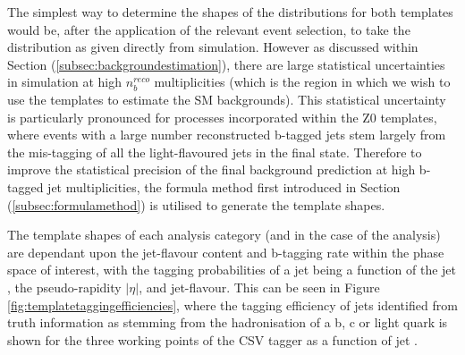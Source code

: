 The simplest way to determine the shapes of the \nbreco distributions for both templates would be, after the application of the relevant event selection, to take the \nbreco distribution as given directly from simulation. However as discussed within Section (\ref{subsec:backgroundestimation}), there are large statistical uncertainties in simulation at high $n_{b}^{reco}$ multiplicities (which is the region in which we wish to use the templates to estimate the \ac{SM} backgrounds). This statistical uncertainty is particularly pronounced for processes incorporated within the Z0 templates, where events with a large number reconstructed b-tagged jets stem largely from the mis-tagging of all the light-flavoured jets in the final state. Therefore to improve the statistical precision of the final background prediction at high b-tagged jet multiplicities, the formula method first introduced in Section (\ref{subsec:formulamethod}) is utilised to generate the template shapes. 

The template shapes of each analysis category (\theht and \njet in the case of the \alphat analysis) are dependant upon the jet-flavour content and b-tagging rate within the phase space of interest, with the tagging probabilities of a jet being a function of the jet \pt, the pseudo-rapidity $\rvert\eta\lvert$, and jet-flavour. This can be seen in Figure \ref{fig:templatetaggingefficiencies}, where the tagging efficiency of jets identified from truth information as stemming from the hadronisation of a b, c or light quark is shown for the three working points of the \ac{CSV} tagger as a function of jet \pt. 

